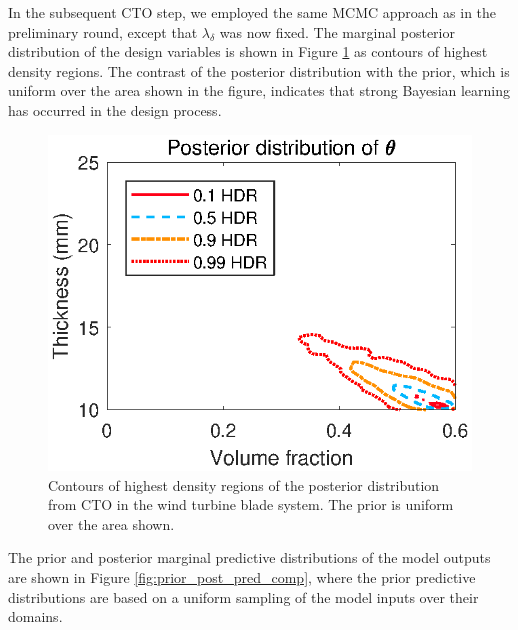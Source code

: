 \documentclass[12pt]{article}
\begin{document}
In the subsequent CTO step, we employed the same MCMC approach as in the preliminary round, except that $\lambda_\delta$ was now fixed.
%
The marginal posterior distribution of the design variables is shown in Figure \ref{fig:wt_marg_post} as contours of highest density regions.
%
The contrast of the posterior distribution with the prior, which is uniform over the area shown in the figure, indicates that strong Bayesian learning has occurred in the design process.
%
\begin{figure}
\centering
\includegraphics[scale=0.8]{FIG_post_dist_contourplot}
\caption{Contours of highest density regions of the posterior distribution from CTO in the wind turbine blade system. The prior is uniform over the area shown.}
\label{fig:wt_marg_post}
\end{figure}
%
The prior and posterior marginal predictive distributions of the model outputs are shown in Figure \ref{fig:prior_post_pred_comp}, where the prior predictive distributions are based on a uniform sampling of the model inputs over their domains.
%
\end{document}
